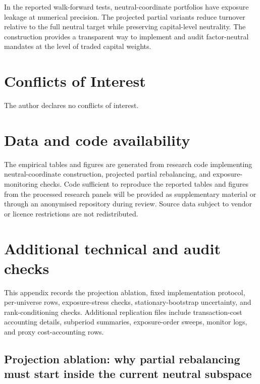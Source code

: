 \documentclass[11pt]{article}
\begin{document}
In the reported walk-forward tests, neutral-coordinate portfolios have exposure leakage at numerical
precision.  The projected partial variants reduce turnover relative to the full neutral target while
preserving capital-level neutrality.  The construction provides a transparent way to implement and audit
factor-neutral mandates at the level of traded capital weights.

\section*{Conflicts of Interest}

The author declares no conflicts of interest.

\section*{Data and code availability}

The empirical tables and figures are generated from research code implementing neutral-coordinate
construction, projected partial rebalancing, and exposure-monitoring checks.  Code sufficient to reproduce
the reported tables and figures from the processed research panels will be provided as supplementary
material or through an anonymised repository during review.  Source data subject to vendor or licence
restrictions are not redistributed.

\FloatBarrier
\appendix
\section{Additional technical and audit checks}
\label{app:additional-diagnostics}

This appendix records the projection ablation, fixed implementation protocol, per-universe rows,
exposure-stress checks, stationary-bootstrap uncertainty, and rank-conditioning checks.  Additional
replication files include transaction-cost accounting details, subperiod summaries, exposure-order
sweeps, monitor logs, and proxy cost-accounting rows.

\subsection{Projection ablation: why partial rebalancing must start inside the current neutral subspace}
\label{app:projection-ablation}
\end{document}
